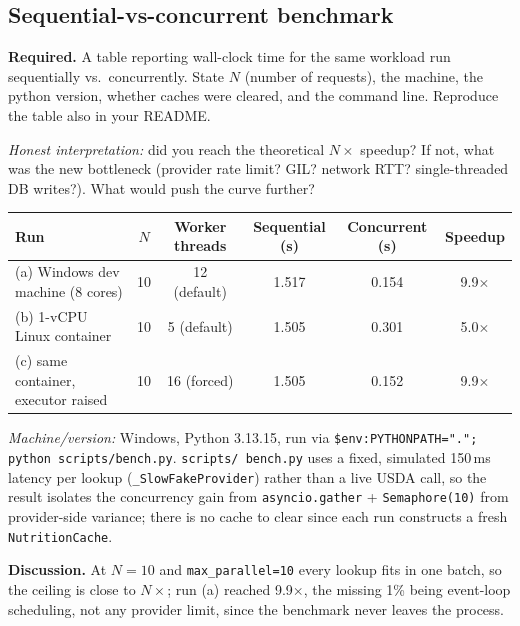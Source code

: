 \documentclass[11pt,a4paper]{article}
\newenvironment{deliverbox}{\begin{deliverboxshown}}{\end{deliverboxshown}}
\newenvironment{probebox}{\begin{probeboxshown}}{\end{probeboxshown}}
\newenvironment{deliverbox}{\setbox0\vbox\bgroup}{\egroup\ignorespacesafterend}
\newenvironment{probebox}{\setbox0\vbox\bgroup}{\egroup\ignorespacesafterend}
\begin{document}
\subsection{Sequential-vs-concurrent benchmark}

\begin{deliverbox}
\textbf{Required.} A table reporting wall-clock time for the same workload run sequentially vs.\ concurrently. State $N$ (number of requests), the machine, the python version, whether caches were cleared, and the command line. Reproduce the table also in your README.
\end{deliverbox}

\begin{probebox}
\textit{Honest interpretation:} did you reach the theoretical $N\times$ speedup? If not, what was the new bottleneck (provider rate limit? GIL? network RTT? single-threaded DB writes?). What would push the curve further?
\end{probebox}

\begin{center}\small
\begin{tabular}{lccccc}
\toprule
\textbf{Run} & $N$ & \textbf{Worker threads} & \textbf{Sequential (s)} & \textbf{Concurrent (s)} & \textbf{Speedup} \\
\midrule
(a) Windows dev machine (8 cores)      & 10 & 12 (default) & 1.517 & 0.154 & 9.9$\times$ \\
(b) 1-vCPU Linux container             & 10 & \phantom{0}5 (default) & 1.505 & 0.301 & 5.0$\times$ \\
(c) same container, executor raised    & 10 & 16 (forced)  & 1.505 & 0.152 & 9.9$\times$ \\
\bottomrule
\end{tabular}
\end{center}

\textit{Machine/version:} Windows, Python 3.13.15, run via
\texttt{\$env:PYTHONPATH="."; python scripts/bench.py}. \texttt{scripts/
bench.py} uses a fixed, simulated 150\,ms latency per lookup
(\texttt{\_SlowFakeProvider}) rather than a live USDA call, so the result
isolates the concurrency gain from \texttt{asyncio.gather} +
\texttt{Semaphore(10)} from provider-side variance; there is no cache to
clear since each run constructs a fresh \texttt{NutritionCache}.

\textbf{Discussion.} At $N=10$ and \texttt{max\_parallel=10} every lookup
fits in one batch, so the ceiling is close to $N\times$; run (a) reached
9.9$\times$, the missing 1\% being event-loop scheduling, not any provider
limit, since the benchmark never leaves the process.
\end{document}
